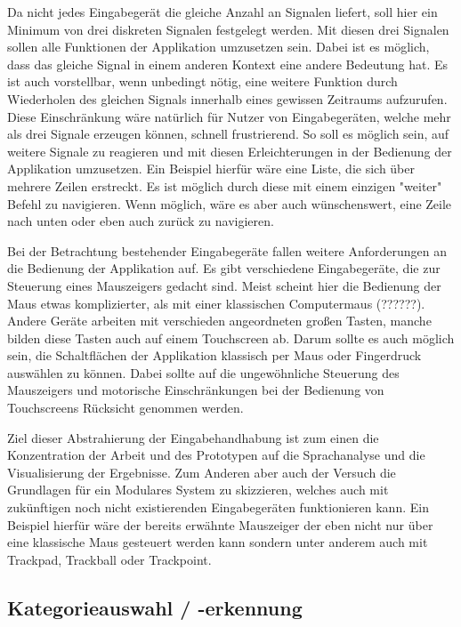         Da nicht jedes Eingabegerät die gleiche Anzahl an Signalen liefert, soll hier ein Minimum von drei diskreten Signalen festgelegt werden. Mit diesen drei Signalen sollen alle Funktionen der Applikation umzusetzen sein. Dabei ist es möglich, dass das gleiche Signal in einem anderen Kontext eine andere Bedeutung hat. Es ist auch vorstellbar, wenn unbedingt nötig, eine weitere Funktion durch Wiederholen des gleichen Signals innerhalb eines gewissen Zeitraums aufzurufen. Diese Einschränkung wäre natürlich für Nutzer von Eingabegeräten, welche mehr als drei Signale erzeugen können, schnell frustrierend. So soll es möglich sein, auf weitere Signale zu reagieren und mit diesen Erleichterungen in der Bedienung der Applikation umzusetzen. Ein Beispiel hierfür wäre eine Liste, die sich über mehrere Zeilen erstreckt. Es ist möglich durch diese mit einem einzigen "weiter" Befehl zu navigieren. Wenn möglich, wäre es aber auch wünschenswert, eine Zeile nach unten oder eben auch zurück zu navigieren.
        
        Bei der Betrachtung bestehender Eingabegeräte fallen weitere Anforderungen an die Bedienung der Applikation auf. Es gibt verschiedene Eingabegeräte, die zur Steuerung eines Mauszeigers gedacht sind. Meist scheint hier die Bedienung der Maus etwas komplizierter, als mit einer klassischen Computermaus (??????). Andere Geräte arbeiten mit verschieden angeordneten großen Tasten, manche bilden diese Tasten auch auf einem Touchscreen ab. Darum sollte es auch möglich sein, die Schaltflächen der Applikation klassisch per Maus oder Fingerdruck auswählen zu können. Dabei sollte auf die ungewöhnliche Steuerung des Mauszeigers und motorische Einschränkungen bei der Bedienung von Touchscreens Rücksicht genommen werden.
        
        Ziel dieser Abstrahierung der Eingabehandhabung ist zum einen die Konzentration der Arbeit und des Prototypen auf die Sprachanalyse und die Visualisierung der Ergebnisse. Zum Anderen aber auch der Versuch die Grundlagen für ein Modulares System zu skizzieren, welches auch mit zukünftigen noch nicht existierenden Eingabegeräten funktionieren kann. Ein Beispiel hierfür wäre der bereits erwähnte Mauszeiger der eben nicht nur über eine klassische Maus gesteuert werden kann sondern unter anderem auch mit Trackpad, Trackball oder Trackpoint.
        
    \newpage   
	\subsection{Kategorieauswahl / -erkennung}
    
